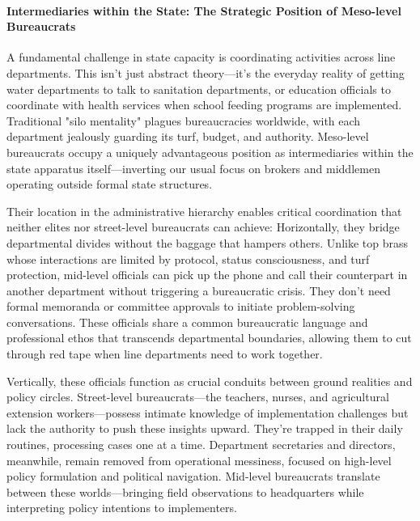 \paragraph{Intermediaries within the State: The Strategic Position of Meso-level Bureaucrats}

A fundamental challenge in state capacity is coordinating activities across line departments. This isn't just abstract theory—it's the everyday reality of getting water departments to talk to sanitation departments, or education officials to coordinate with health services when school feeding programs are implemented. Traditional "silo mentality" plagues bureaucracies worldwide, with each department jealously guarding its turf, budget, and authority. Meso-level bureaucrats occupy a uniquely advantageous position as intermediaries within the state apparatus itself—inverting our usual focus on brokers and middlemen operating outside formal state structures.

Their location in the administrative hierarchy enables critical coordination that neither elites nor street-level bureaucrats can achieve: Horizontally, they bridge departmental divides without the baggage that hampers others. Unlike top brass whose interactions are limited by protocol, status consciousness, and turf protection, mid-level officials can pick up the phone and call their counterpart in another department without triggering a bureaucratic crisis. They don't need formal memoranda or committee approvals to initiate problem-solving conversations. These officials share a common bureaucratic language and professional ethos that transcends departmental boundaries, allowing them to cut through red tape when line departments need to work together.

Vertically, these officials function as crucial conduits between ground realities and policy circles. Street-level bureaucrats—the teachers, nurses, and agricultural extension workers—possess intimate knowledge of implementation challenges but lack the authority to push these insights upward. They're trapped in their daily routines, processing cases one at a time. Department secretaries and directors, meanwhile, remain removed from operational messiness, focused on high-level policy formulation and political navigation. Mid-level bureaucrats translate between these worlds—bringing field observations to headquarters while interpreting policy intentions to implementers.


